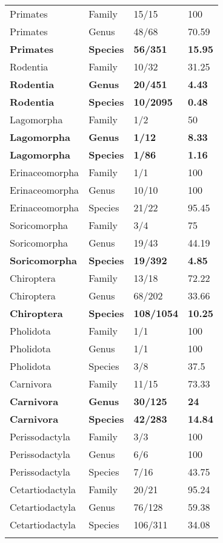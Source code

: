 \begin{longtable}{llll}
  Primates & Family & 15/15 & 100 \\ 
  Primates & Genus & 48/68 & 70.59 \\ 
  \textbf{Primates} & \textbf{Species} & \textbf{56/351} & \textbf{15.95} \\ 
  Rodentia & Family & 10/32 & 31.25 \\ 
  \textbf{Rodentia} & \textbf{Genus} & \textbf{20/451} & \textbf{4.43} \\ 
  \textbf{Rodentia} & \textbf{Species} & \textbf{10/2095} & \textbf{0.48} \\ 
  Lagomorpha & Family & 1/2 & 50 \\ 
  \textbf{Lagomorpha} & \textbf{Genus} & \textbf{1/12} & \textbf{8.33} \\ 
  \textbf{Lagomorpha} & \textbf{Species} & \textbf{1/86} & \textbf{1.16} \\ 
  Erinaceomorpha & Family & 1/1 & 100 \\ 
  Erinaceomorpha & Genus & 10/10 & 100 \\ 
  Erinaceomorpha & Species & 21/22 & 95.45 \\ 
  Soricomorpha & Family & 3/4 & 75 \\ 
  Soricomorpha & Genus & 19/43 & 44.19 \\ 
  \textbf{Soricomorpha} & \textbf{Species} & \textbf{19/392} & \textbf{4.85} \\ 
  Chiroptera & Family & 13/18 & 72.22 \\ 
  Chiroptera & Genus & 68/202 & 33.66 \\ 
  \textbf{Chiroptera} & \textbf{Species} & \textbf{108/1054} & \textbf{10.25} \\ 
  Pholidota & Family & 1/1 & 100 \\ 
  Pholidota & Genus & 1/1 & 100 \\ 
  Pholidota & Species & 3/8 & 37.5 \\ 
  Carnivora & Family & 11/15 & 73.33 \\ 
  \textbf{Carnivora} & \textbf{Genus} & \textbf{30/125} & \textbf{24} \\ 
  \textbf{Carnivora} & \textbf{Species} & \textbf{42/283} & \textbf{14.84} \\ 
  Perissodactyla & Family & 3/3 & 100 \\ 
  Perissodactyla & Genus & 6/6 & 100 \\ 
  Perissodactyla & Species & 7/16 & 43.75 \\ 
  Cetartiodactyla & Family & 20/21 & 95.24 \\ 
  Cetartiodactyla & Genus & 76/128 & 59.38 \\ 
  Cetartiodactyla & Species & 106/311 & 34.08 \\ 
   \hline
\hline
\label{Table_morpho_taxa_proportion}
\end{longtable}
